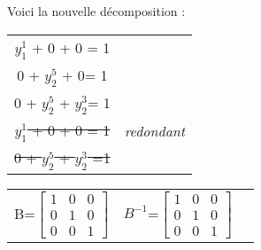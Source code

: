 Voici la nouvelle décomposition :

\begin{tabular}{cc}
$y_1^1$  + 0 + 0 = 1 & \\
0 + $y_2^5$ + 0= 1 & \\
0 + $y_2^5$ + $y_2^3$= 1 & \\
\sout{$y_1^1$  + 0 + 0 = 1} & \textit{redondant}\\
\sout{0 + $y_2^5$ + $y_2^3$ =1} & \\ 
\end{tabular}

\begin{center}
\begin{tabular}{c c c}
B=$\begin{bmatrix}
1 & 0 & 0\\
0 & 1 & 0 \\
0 & 0 & 1 
 \end{bmatrix} $                  
&
$B^{-1}$=$\begin{bmatrix}
1 & 0 & 0\\
0 & 1 & 0 \\
0 & 0 & 1 
 \end{bmatrix} $             
\end{tabular}
\end{center}

